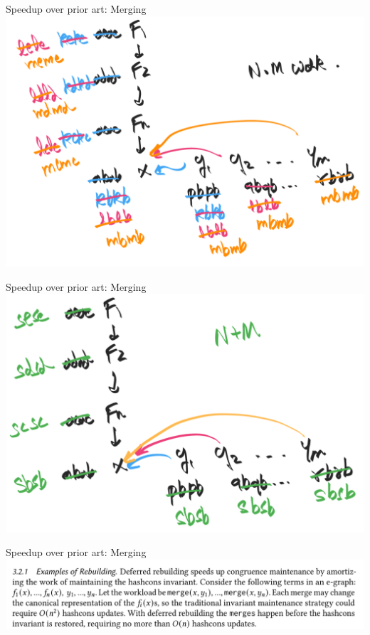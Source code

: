\documentclass[8pt]{beamer}
\begin{document}
\begin{frame}[fragile]{Speedup over prior art: Merging}
\includegraphics[width=\textwidth]{./eg-2-4.png}
\end{frame}


\begin{frame}[fragile]{Speedup over prior art: Merging}
\includegraphics[width=\textwidth]{./eg-2-5.png}
\end{frame}


\begin{frame}[fragile]{Speedup over prior art: Merging}
\includegraphics[width=\textwidth]{./eg-2-paper-snippet.png}
\end{frame}
\end{document}
